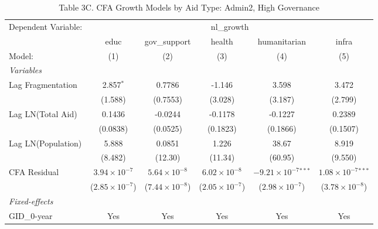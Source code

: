 \begin{table}[H]
   \caption{Table 3C. CFA Growth Models by Aid Type: Admin2, High Governance}
   \centering
   \begin{tabular}{lccccc}
      \tabularnewline \midrule \midrule
      Dependent Variable: & \multicolumn{5}{c}{nl\_growth}\\
                         & educ                    & gov\_support            & health                  & humanitarian                   & infra \\   
      Model:             & (1)                     & (2)                     & (3)                     & (4)                            & (5)\\  
      \midrule
      \emph{Variables}\\
      Lag Fragmentation  & 2.857$^{*}$             & 0.7786                  & -1.146                  & 3.598                          & 3.472\\   
                         & (1.588)                 & (0.7553)                & (3.028)                 & (3.187)                        & (2.799)\\   
      Lag LN(Total Aid)  & 0.1436                  & -0.0244                 & -0.1178                 & -0.1227                        & 0.2389\\   
                         & (0.0838)                & (0.0525)                & (0.1823)                & (0.1866)                       & (0.1507)\\   
      Lag LN(Population) & 5.888                   & 0.0851                  & 1.226                   & 38.67                          & 8.919\\   
                         & (8.482)                 & (12.30)                 & (11.34)                 & (60.95)                        & (9.550)\\   
      CFA Residual       & $3.94\times 10^{-7}$    & $5.64\times 10^{-8}$    & $6.02\times 10^{-8}$    & $-9.21\times 10^{-7}$$^{***}$  & $1.08\times 10^{-7}$$^{***}$\\    
                         & ($2.85\times 10^{-7}$)  & ($7.44\times 10^{-8}$)  & ($2.05\times 10^{-7}$)  & ($2.98\times 10^{-7}$)         & ($3.78\times 10^{-8}$)\\    
      \midrule
      \emph{Fixed-effects}\\
      GID\_0-year        & Yes                     & Yes                     & Yes                     & Yes                            & Yes\\  

\end{tabular}
\end{table}
